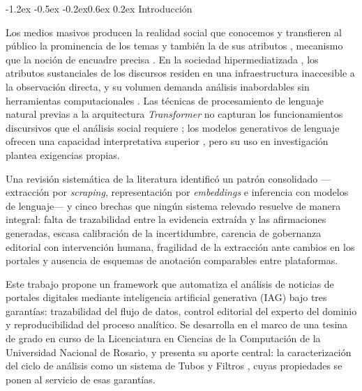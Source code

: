 \documentclass[12pt,a4paper,twocolumn]{article}
\makeatletter
\renewcommand\section{\@startsection{section}{1}{\z@}%
  {-1.2ex \@plus -0.5ex \@minus -0.2ex}{0.6ex \@plus 0.2ex}%
  {\normalfont\normalsize\bfseries}}
\makeatother
\begin{document}
\section{Introducción}

Los medios masivos producen la realidad social que conocemos \cite{luhmann2000} y transfieren al público la prominencia de los temas y también la de sus atributos \cite{mccombs:1972,mccombs:1997}, mecanismo que la noción de encuadre precisa \cite{entman:1993}. En la sociedad hipermediatizada \cite{carlon:2020,couldry:2017}, los atributos sustanciales de los discursos residen en una infraestructura inaccesible a la observación directa, y su volumen demanda análisis inabordables sin herramientas computacionales \cite{berry:2011}. Las técnicas de procesamiento de lenguaje natural previas a la arquitectura \textit{Transformer} \cite{vaswani:2017} no capturan los funcionamientos discursivos que el análisis social requiere \cite{gindin:2018}; los modelos generativos de lenguaje ofrecen una capacidad interpretativa superior \cite{pavlyshenko2024,milbauer2023}, pero su uso en investigación plantea exigencias propias.

Una revisión sistemática de la literatura identificó un patrón consolidado ---extracción por \textit{scraping}, representación por \textit{embeddings} e inferencia con modelos de lenguaje--- y cinco brechas que ningún sistema relevado resuelve de manera integral: falta de trazabilidad entre la evidencia extraída y las afirmaciones generadas, escasa calibración de la incertidumbre, carencia de gobernanza editorial con intervención humana, fragilidad de la extracción ante cambios en los portales y ausencia de esquemas de anotación comparables entre plataformas.

Este trabajo propone un framework que automatiza el análisis de noticias de portales digitales mediante inteligencia artificial generativa (IAG) bajo tres garantías: trazabilidad del flujo de datos, control editorial del experto del dominio y reproducibilidad del proceso analítico. Se desarrolla en el marco de una tesina de grado en curso de la Licenciatura en Ciencias de la Computación de la Universidad Nacional de Rosario, y presenta su aporte central: la caracterización del ciclo de análisis como un sistema de Tubos y Filtros \cite{garlanshaw:1994}, cuyas propiedades se ponen al servicio de esas garantías.

\end{document}
